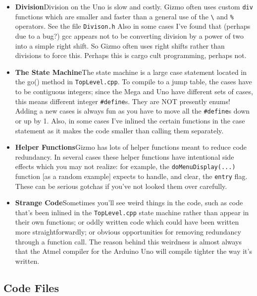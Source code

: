 \documentclass{article}
\begin{document}
\begin{itemize}

\item {\bf Division}\quad  Division on the Uno is slow and costly.  Gizmo often uses custom \texttt{div}
  functions which are smaller and faster than a general use of the \texttt{\textbackslash} and \texttt{\%}
  operators.  See the file \texttt{Divison.h}  Also in some cases I've found that (perhaps due to a bug?)
  gcc appears not to be converting division by a power of two into a simple right shift.
  So Gizmo often uses right shifts rather than divisions to force this.  Perhaps this
  is cargo cult programming, perhaps not.

\item {\bf The State Machine}\quad  The state machine is a large case statement located in the go()
  method in \texttt{TopLevel.cpp}. To compile to a jump table, the cases have to be contiguous
  integers; since the Mega and Uno have different sets of cases, this means different
  integer \texttt{\#define}s.  They are NOT presently enums!  Adding a new cases is always fun 
  as you have to move all the \texttt{\#define}s down or up by 1.   Also, in some cases I've 
  inlined the certain functions in the case statement as it makes the code smaller 
  than calling them separately.

\item {\bf Helper Functions}\quad  Gizmo has lots of helper functions meant to reduce code redundancy.
  In several cases these helper functions have intentional side effects which you may
  not realize: for example, the \texttt{doMenuDisplay(...)} function [as a random example] expects
  to handle, and clear, the \texttt{entry} flag.  These can be serious gotchas if you've not
  looked them over carefully.

\item {\bf Strange Code}\quad  Sometimes you'll see weird things in the code, such as code that's been inlined
 in the \texttt{TopLevel.cpp} state machine rather than appear in their own functions; or oddly written
 code which could have been written more straightforwardly; or obvious opportunities for removing
 redundancy through a function call.  The reason behind this weirdness is almost always that the
 Atmel compiler for the Arduino Uno will compile tighter the way it's written.

\end{itemize}

\subsection{Code Files}
\end{document}
